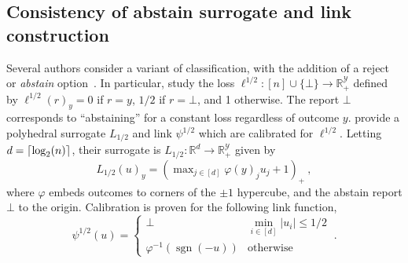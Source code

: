 \documentclass[11pt]{article}
\newcommand{\reals}{\mathbb{R}}
\newcommand{\Y}{\mathcal{Y}}
\DeclarePairedDelimiter\ceil{\lceil}{\rceil}
\newcommand{\ellabs}{\ell_{\text{abs}}^f}
\DeclareMathOperator*{\sgn}{sgn}
\begin{document}
\subsection{Consistency of abstain surrogate and link construction}
\label{sec:abstain}


Several authors consider a variant of classification, with the addition of a reject or \emph{abstain} option~\citep{bartlett2008classification,ramaswamy2018consistent,madras2018predict,elyaniv2010foundations,cortes2016learning}.
In particular, \citet{ramaswamy2018consistent} study the loss $\ell^{1/2} : [n] \cup \{\bot\} \to \reals^\Y_+$ defined by $\ell^{1/2}(r)_y = 0$ if $r=y$, $1/2$ if $r = \bot$, and 1 otherwise.
The report $\bot$ corresponds to ``abstaining'' for a constant loss regardless of outcome $y$. %
\citeauthor{ramaswamy2018consistent} provide a polyhedral surrogate $L_{1/2}$ and link $\psi^{1/2}$ which are calibrated for $\ell^{1/2}$.
Letting $d = \ceil{\log_2(n)}$, their surrogate is $L_{1/2} : \reals^d \to \reals^\Y_+$ given by
\begin{equation}\label{eq:abstain-surrogate}
L_{1/2}(u)_y = \left(\max\nolimits_{j \in [d]}\varphi(y)_j u_j + 1\right)_+~,
\end{equation}
where $\varphi$ embeds outcomes to corners of the $\pm 1$ hypercube, and the abstain report $\bot$ to the origin.
Calibration is proven for the following link function,
\begin{equation}\label{eq:abstain-link}
  \psi^{1/2}(u) = \begin{cases}
	\bot & \min_{i \in [d]} |u_i| \leq 1/2\\
	\varphi^{-1}(\sgn(-u)) &\text{otherwise}
  \end{cases}~.
\end{equation}
\end{document}
